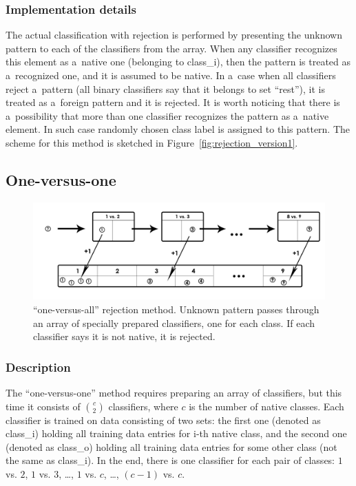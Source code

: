 \subsubsection{Implementation details}

The actual classification with rejection is performed by presenting the unknown pattern to each of the classifiers from the array. When any classifier recognizes this element as a~native one (belonging to class\_i), then the pattern is treated as a~recognized one, and it is assumed to be native. In a~case when all classifiers reject a~pattern (all binary classifiers say that it belongs to set ``rest''), it is treated as a~foreign pattern and it is rejected. It is worth noticing that there is a~possibility that more than one classifier recognizes the pattern as a~native element. In such case randomly chosen class label is assigned to this pattern. The scheme for this method is sketched in Figure~\ref{fig:rejection_version1}. 

\subsection{One-versus-one}
\label{one-versus-all}

\begin{figure}[htp]
	\centering
	\includegraphics[width=1\textwidth]{Figures/classification_with_rejection2.jpg}
	\caption{``one-versus-all'' rejection method. Unknown pattern passes through an array of specially prepared classifiers, one for each class. If each classifier says it is not native, it is rejected. }
	\label{fig:rejection_version2}\vspace{-3pt}
\end{figure}

\subsubsection{Description}

The ``one-versus-one'' method requires preparing an array of classifiers, but this time it consists of ${c}\choose{2}$ classifiers, where $c$ is the number of native classes. Each classifier is trained on data consisting of two sets: the first one (denoted as class\_i) holding all training data entries for i-th native class, and the second one (denoted as class\_o) holding all training data entries for some other class (not the same as class\_i). In the end, there is one classifier for each pair of classes: $1$ vs. $2$, $1$ vs. $3$, \dots, $1$ vs. $c$, \dots, $(c-1)$ vs. $c$. 

